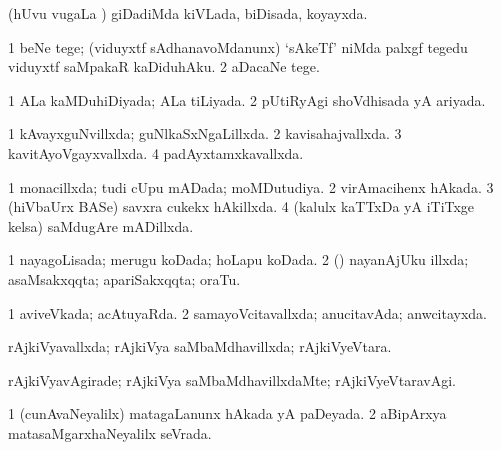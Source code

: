 {{\bentry
{} 
\gl{\gu}
\expl{}
\bmng
(hUvu \mo vugaLa \vi) giDadiMda kiVLada, biDisada, koyayxda. 
\emng
\eentry

\bentry
{} 
\gl{\sakirx}
\bmng
\bnum
\num{1} beNe tege; (viduyxtf sAdhanavoMdanunx) `sAkeTf' niMda palxgf tegedu viduyxtf saMpakaR kaDiduhAku. 
\num{2} aDacaNe tege. 
\enum
\emng
\eentry

\bentry
{} 
\gl{\gu}
\expl{}
\bmng
\bnum
\num{1} ALa kaMDuhiDiyada; ALa tiLiyada. 
\num{2} pUtiRyAgi shoVdhisada yA ariyada. 
\enum
\emng
\eentry

\bentry
{} 
\gl{\gu}
\expl{}
\bmng
\bnum
\num{1} kAvayxguNvillxda; guNlkaSxNgaLillxda. 
\num{2} kavisahajvallxda. 
\num{3} kavitAyoVgayxvallxda. 
\num{4} padAyxtamxkavallxda. 
\enum
\emng
\eentry

\bentry
{} 
\gl{\gu}
\expl{}
\bmng
{} 
\emng
\eentry

\bentry
{} 
\gl{\gu}
\expl{}
\bmng
\bnum
\num{1} monacillxda; tudi cUpu mADada; moMDutudiya. 
\num{2} virAmacihenx hAkada. 
\num{3} (hiVbaUrx BASe) savxra cukekx hAkillxda. 
\num{4} (kalulx kaTTxDa yA iTiTxge kelsa) saMdugAre mADillxda. 
\enum
\emng
\eentry

\bentry 
{} 
\gl{\gu}
\expl{}
\bmng
\bnum
\num{1} nayagoLisada; merugu koDada; hoLapu koDada. 
\num{2} (\rUpa) nayanAjUku illxda; asaMsakxqqta; apariSakxqqta; oraTu. 
\enum
\emng
\eentry

\bentry
{} 
\gl{\gu}
\expl{}
\bmng
\bnum
\num{1} aviveVkada; acAtuyaRda. 
\num{2} samayoVcitavallxda; anucitavAda; anwcitayxda. 
\enum
\emng
\eentry

\bentry
{} 
\gl{\gu}
\expl{}
\bmng
rAjkiVyavallxda; rAjkiVya saMbaMdhavillxda; rAjkiVyeVtara. 
\emng
\eentry

\bentry
{} 
\gl{\kirxvi}
\expl{}
\bmng
rAjkiVyavAgirade; rAjkiVya saMbaMdhavillxdaMte; rAjkiVyeVtaravAgi. 
\emng
\eentry

\bentry
{} 
\gl{\gu}
\expl{}
\bmng
\bnum
\num{1} (cunAvaNeyalilx) matagaLanunx hAkada yA paDeyada. 
\num{2} aBipArxya matasaMgarxhaNeyalilx seVrada. 
\enum
\emng
\eentry

}}

